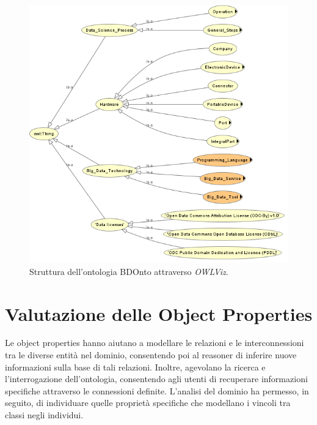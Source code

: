 \begin{figure}[H]
    \centering
    \includegraphics[width=15cm]{docs/images/owlvizBdonto.png}
    \caption{Struttura dell'ontologia BDOnto attraverso \textit{OWLViz}.}
    \label{fig:owlviz_bdonto}
\end{figure}
\newpage
\section{Valutazione delle Object Properties}
Le object properties hanno aiutano a modellare le relazioni e le interconnessioni tra le diverse entità nel dominio, consentendo poi al reasoner di inferire nuove informazioni sulla base di tali relazioni. Inoltre, agevolano la ricerca e l'interrogazione dell'ontologia, consentendo agli utenti di recuperare informazioni specifiche attraverso le connessioni definite. L'analisi del dominio ha permesso, in seguito, di individuare quelle proprietà specifiche che modellano i vincoli tra classi negli individui.\\

